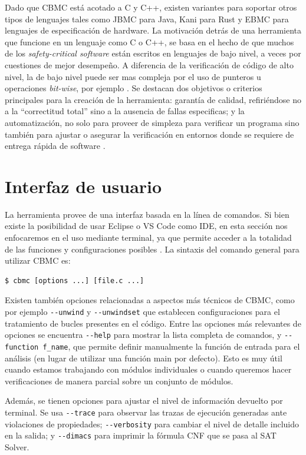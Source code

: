 \documentclass[runningheads]{llncs}
\begin{document}
Dado que CBMC está acotado a C y C++, existen variantes para soportar otros tipos de lenguajes tales como JBMC para Java, Kani para Rust y EBMC para 
lenguajes de especificación de hardware.
La motivación detrás de una herramienta que funcione en un lenguaje como C o C++, se basa en el hecho de que muchos de los \textit{safety-critical software} están escritos
en lenguajes de bajo nivel, a veces por cuestiones de mejor desempeño.
A diferencia de la verificación de código de alto nivel, la de bajo nivel puede ser mas compleja por el uso de punteros u operaciones \textit{bit-wise}, por ejemplo \cite{tacas-2004}.
Se destacan dos objetivos o criterios principales para la creación de la herramienta: garantía de calidad, refiriéndose no a la “correctitud total” 
sino a la ausencia de fallas especificas; y la automatización, no solo para proveer de simpleza para verificar un programa sino también para ajustar o asegurar 
la verificación en entornos donde se requiere de entrega rápida de software \cite{tacas-2004}.

%
\section{Interfaz de usuario}
La herramienta provee de una interfaz basada en la línea de comandos.
Si bien existe la posibilidad de usar Eclipse o VS Code como IDE, en esta sección nos enfocaremos en el uso mediante terminal, ya que permite acceder a la
totalidad de las funciones y configuraciones posibles \cite{cprover-manual}.
La sintaxis del comando general para utilizar CBMC es:
\begin{verbatim}
$ cbmc [options ...] [file.c ...]
\end{verbatim}

Existen también opciones relacionadas a aspectos más técnicos de CBMC, como por ejemplo \verb|--unwind| y \verb|--unwindset| que establecen configuraciones 
para el tratamiento de bucles presentes en el código.
Entre las opciones más relevantes de opciones se encuentra \verb|--help| para mostrar la lista completa de comandos, y \verb|--function f_name|, que permite definir
manualmente la función de entrada para el análisis (en lugar de utilizar una función main por defecto).
Esto es muy útil cuando estamos trabajando con módulos individuales o cuando queremos hacer verificaciones de manera parcial sobre un conjunto de módulos.

Además, se tienen opciones para ajustar el nivel de información devuelto por terminal.
Se usa \verb|--trace| para observar las trazas de ejecución generadas ante violaciones de propiedades; \verb|--verbosity| para cambiar el nivel de detalle incluido en la salida;
y \verb|--dimacs| para imprimir la fórmula CNF que se pasa al SAT Solver.
\end{document}
